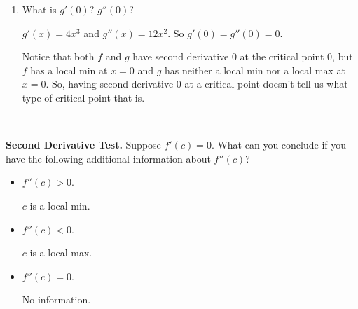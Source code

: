 \documentclass{article}
\makeatletter
\newlength{\tipmargin}
\renewenvironment{framed}{
  \setlength{\tipmargin}{\textwidth-\linewidth}
  \advance\@totalleftmargin-\tipmargin
  \def\FrameCommand{\hspace{\tipmargin}\fbox}%
  \advance\linewidth\tipmargin
  \MakeFramed {\advance\hsize-\width \FrameRestore}%
}
{\endMakeFramed}
\makeatother
\begin{document}
\begin{enumerate}[resume]
\begin{enumerate}
    \begin{solution} 
       $f'(x) = 3x^2$ and $f''(x) = 6x$. So  $f'(0)=f''(0)=0$.
    \end{solution} 

  \item
    \begin{problem}[0.75in]
      What is $g'(0)$? $g''(0)$?
    \end{problem}

    \begin{solution} 
       $g'(x) = 4x^3$ and $g''(x) = 12x^2$. So  $g'(0)=g''(0)=0$.

        Notice that both $f$ and $g$ have second derivative 0 at the critical point 0, but $f$ has a local min at $x = 0$ and $g$ has neither a local min nor a local max at $x = 0$. So, having second derivative 0 at a critical point doesn't tell us what type of critical point that is.
    \end{solution} 

  \end{enumerate}

\end{enumerate}
\begin{framed}
  \textbf{Second Derivative Test.} Suppose $f'(c) = 0$.  What can you
  conclude if you have the following additional information about
  $f''(c)$?
  \begin{itemize}
  \item $f''(c) > 0$.

    \begin{solution}
      $c$ is a local min.
    \end{solution} 

  \item $f''(c) < 0$.

    \begin{solution}
      $c$ is a local max.
    \end{solution} 

  \item $f''(c) = 0$.

    \begin{solution}
      No information.
    \end{solution}

  \end{itemize}  
\end{framed}

\end{document}
